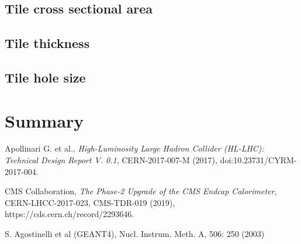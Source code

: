 \documentclass[a4paper,11pt]{article}
\begin{document}
\subsection{Tile cross sectional area}

\subsection{Tile thickness}

\subsection{Tile hole size}

\section{Summary}


\begin{thebibliography}{99}

Apollinari G. et al., \emph{High-Luminosity Large Hadron Collider (HL-LHC): Technical Design Report V. 0.1}, CERN-2017-007-M (2017), doi:10.23731/CYRM-2017-004.

CMS Collaboration, \emph{The Phase-2 Upgrade of the CMS Endcap Calorimeter}, CERN-LHCC-2017-023, CMS-TDR-019 (2019), https://cds.cern.ch/record/2293646.

S. Agostinelli et al (GEANT4), Nucl. Instrum. Meth. A, 506: 250 (2003)


\end{thebibliography}
\end{document}
